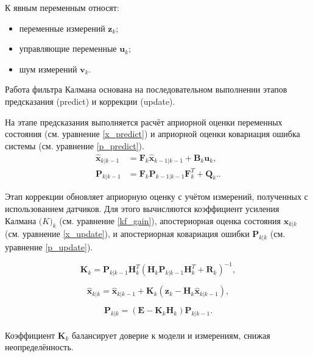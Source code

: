 К явным переменным относят:
\begin{itemize}
    \item переменные измерений $\mathbf{z}_k$; 
    \item управляющие переменные $\mathbf{u}_k$; 
    \item шум измерений $\mathbf{v}_k$.
\end{itemize}

Работа фильтра Калмана основана на последовательном выполнении этапов предсказания (predict) и 
коррекции (update).

На этапе предсказания выполняется расчёт 
априорной оценки переменных состояния (см. уравнение \ref{x_predict})
и априорной оценки ковариация ошибка системы (см. уравнение \ref{p_predict}).
\begin{align}
\hat{\mathbf{x}}_{k|k-1} &= \mathbf{F}_k \hat{\mathbf{x}}_{k-1|k-1} + \mathbf{B}_k \mathbf{u}_k, \label{x_predict}\\
\mathbf{P}_{k|k-1} &= \mathbf{F}_k \mathbf{P}_{k-1|k-1} \mathbf{F}_k^T + \mathbf{Q}_k. \label{p_predict}.
\end{align}

Этап коррекции обновляет априорную оценку с учётом измерений, полученных с использованием датчиков.
Для этого вычисляются коэффициент усиления Калмана \(\mathbf(K)_k\) (см. уравнение \ref{kf_gain}),
апостериорная оценка состояния \(\mathbf{x}_{k|k}\) (см. уравнение \ref{x_update}),
и апостериорная ковариация ошибки \(\mathbf{P}_{k|k}\) (см. уравнение \ref{p_update}).

\begin{equation}
\label{kf_gain}
\mathbf{K}_k = \mathbf{P}_{k|k-1} \mathbf{H}_k^T (\mathbf{H}_k \mathbf{P}_{k|k-1} \mathbf{H}_k^T + \mathbf{R}_k)^{-1},
\end{equation}

\begin{equation}
\label{x_update}
\hat{\mathbf{x}}_{k|k} = \hat{\mathbf{x}}_{k|k-1} + \mathbf{K}_k (\mathbf{z}_k - \mathbf{H}_k \hat{\mathbf{x}}_{k|k-1}),
\end{equation}

\begin{equation}
\label{p_update}
\mathbf{P}_{k|k} = (\mathbf{E} - \mathbf{K}_k \mathbf{H}_k) \mathbf{P}_{k|k-1}.
\end{equation}
\\

Коэффициент \(\mathbf{K}_k\) балансирует доверие к модели и измерениям, снижая неопределённость.

